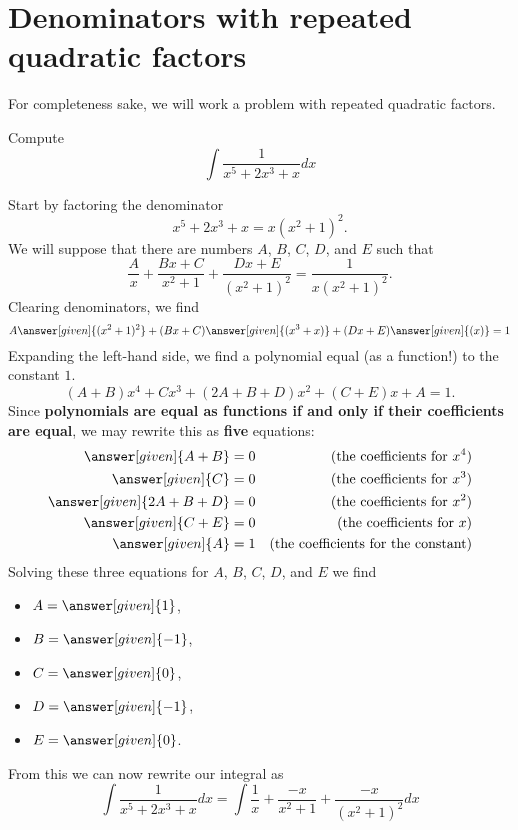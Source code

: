 \documentclass{ximera}
\begin{document}
\section{Denominators with repeated quadratic factors}

For completeness sake, we will work a problem with repeated quadratic factors.

\begin{example}
  Compute
  \[
  \int \frac{1}{x^5 + 2x^3  + x}dx
  \]
  \begin{explanation}
    Start by factoring the denominator
    \[
    x^5 + 2x^3  + x = x(x^2+1)^2.
    \]
    We will suppose that there are numbers $A$, $B$, $C$, $D$, and $E$
    such that
    \[
    \frac{A}{x} + \frac{Bx+C}{x^2+1} + \frac{Dx+E}{(x^2+1)^2} = \frac{1}{x(x^2+1)^2}.
    \]
    Clearing denominators, we find
    \[
    A\answer[given]{(x^2+1)^2} + (Bx+C)\answer[given]{(x^3+x)}+ (Dx+E)\answer[given]{(x)} = 1
    \]
    Expanding the left-hand side, we find a polynomial equal (as a
    function!) to the constant $1$.
    \[
    (A+B)x^4 +  Cx^3 + (2A+B+D)x^2 + (C+E)x + A = 1.
    \]
    Since \textbf{polynomials are equal as functions if and only if
      their coefficients are equal}, we may rewrite this as
    \textbf{five} equations:
    \begin{align*}
      \answer[given]{A+B} &= 0 &\text{(the coefficients for $x^4$)}\\
      \answer[given]{C} &= 0 &\text{(the coefficients for $x^3$)}\\
      \answer[given]{2A+B+D} &= 0 &\text{(the coefficients for $x^2$)}\\
      \answer[given]{C+E} &= 0 &\text{(the coefficients for $x$)}\\
      \answer[given]{A} &= 1 &\text{(the coefficients for the constant)}
    \end{align*}
    Solving these three equations for $A$, $B$, $C$, $D$, and $E$ we find
    \begin{itemize}
    \item $A = \answer[given]{1}$,
    \item $B = \answer[given]{-1}$,
    \item $C = \answer[given]{0}$,
    \item $D = \answer[given]{-1}$,
    \item $E = \answer[given]{0}$.
    \end{itemize}
    From this we can now rewrite our integral as
    \[
    \int \frac{1}{x^5 + 2x^3  + x}dx =\int \frac{1}{x} + \frac{-x}{x^2+1} + \frac{-x}{(x^2+1)^2}dx
\]
\end{explanation}
\end{example}
\end{document}
